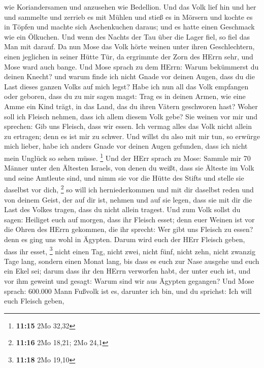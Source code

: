 wie Koriandersamen und anzusehen wie Bedellion.  Und das
Volk lief hin und her und sammelte und zerrieb es mit Mühlen und stieß
es in Mörsern und kochte es in Töpfen und machte sich Aschenkuchen
daraus; und es hatte einen Geschmack wie ein Ölkuchen.  Und
wenn des Nachts der Tau über die Lager fiel, so fiel das Man mit darauf.
 Da nun Mose das Volk hörte weinen unter ihren
Geschlechtern, einen jeglichen in seiner Hütte Tür, da ergrimmte der
Zorn des HErrn sehr, und Mose ward auch bange.  Und Mose
sprach zu dem HErrn: Warum bekümmerst du deinen Knecht? und warum finde
ich nicht Gnade vor deinen Augen, dass du die Last dieses ganzen Volks
auf mich legst?  Habe ich nun all das Volk empfangen oder
geboren, dass du zu mir sagen magst: Trag es in deinen Armen, wie eine
Amme ein Kind trägt, in das Land, das du ihren Vätern geschworen hast?
 Woher soll ich Fleisch nehmen, dass ich allem diesem Volk
gebe? Sie weinen vor mir und sprechen: Gib uns Fleisch, dass wir essen.
 Ich vermag alles das Volk nicht allein zu ertragen; denn
es ist mir zu schwer.  Und willst du also mit mir tun, so
erwürge mich lieber, habe ich anders Gnade vor deinen Augen gefunden,
dass ich nicht mein Unglück so sehen müsse. \footnote{\textbf{11:15} 2Mo
  32,32}  Und der HErr sprach zu Mose: Sammle mir 70 Männer
unter den Ältesten Israels, von denen du weißt, dass sie Älteste im Volk
und seine Amtleute sind, und nimm sie vor die Hütte des Stifts und
stelle sie daselbst vor dich, \footnote{\textbf{11:16} 2Mo 18,21; 2Mo
  24,1}  so will ich herniederkommen und mit dir daselbst
reden und von deinem Geist, der auf dir ist, nehmen und auf sie legen,
dass sie mit dir die Last des Volkes tragen, dass du nicht allein
tragest.  Und zum Volk sollst du sagen: Heiliget euch auf
morgen, dass ihr Fleisch esset; denn euer Weinen ist vor die Ohren des
HErrn gekommen, die ihr sprecht: Wer gibt uns Fleisch zu essen? denn es
ging uns wohl in Ägypten. Darum wird euch der HErr Fleisch geben, dass
ihr esset, \footnote{\textbf{11:18} 2Mo 19,10}  nicht einen
Tag, nicht zwei, nicht fünf, nicht zehn, nicht zwanzig Tage lang,
 sondern einen Monat lang, bis dass es euch zur Nase
ausgehe und euch ein Ekel sei; darum dass ihr den HErrn verworfen habt,
der unter euch ist, und vor ihm geweint und gesagt: Warum sind wir aus
Ägypten gegangen?  Und Mose sprach: 600.000 Mann Fußvolk
ist es, darunter ich bin, und du sprichst: Ich will euch Fleisch geben,
